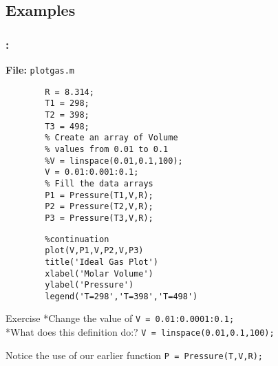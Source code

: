 \documentclass[11pt]{beamer}
\begin{document}
\subsection{Examples}
\begin{frame}[fragile]
	
	\frametitle{\secname : \subsecname}
	\vspace{-17pt}
	\begin{minipage}[t]{0.47\linewidth}
		\textbf{File:} \verb|plotgas.m|
		\begin{verbatim}
		R = 8.314; 
		T1 = 298;
		T2 = 398;
		T3 = 498;
		% Create an array of Volume 
		% values from 0.01 to 0.1
		%V = linspace(0.01,0.1,100);
		V = 0.01:0.001:0.1;
		% Fill the data arrays
		P1 = Pressure(T1,V,R);
		P2 = Pressure(T2,V,R);
		P3 = Pressure(T3,V,R);
		\end{verbatim}	
	\end{minipage}
	\hspace{7pt}
	\begin{minipage}[t]{0.47\linewidth}
		\begin{verbatim}
		%continuation
		plot(V,P1,V,P2,V,P3)
		title('Ideal Gas Plot')
		xlabel('Molar Volume')
		ylabel('Pressure')
		legend('T=298','T=398','T=498')
		\end{verbatim}
	\begin{block}{Exercise}
	*Change the value of \verb|V = 0.01:0.0001:0.1;| \\
	*What does this definition do:? \verb|V = linspace(0.01,0.1,100);|
	\end{block}
	\begin{exampleblock}{}
	Notice the use of our earlier function
	\verb|P = Pressure(T,V,R);|
	\end{exampleblock}			
	\end{minipage}
	
\end{frame}
\end{document}
